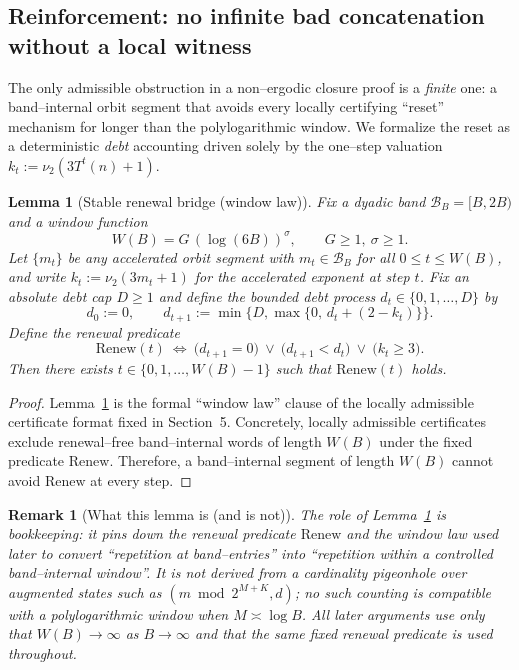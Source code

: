 \documentclass[preprint,12pt]{elsarticle}
\newtheorem{remark}{Remark}
\newtheorem{lemma}{Lemma}
\begin{document}
\subsection*{Reinforcement: no infinite bad concatenation without a local witness}
The only admissible obstruction in a non--ergodic closure proof is a 
\emph{finite} one: a band--internal orbit segment that avoids every locally 
certifying ``reset'' mechanism for longer than the polylogarithmic window.
We formalize the reset as a deterministic \emph{debt} accounting driven solely by the
one--step valuation $k_t:=\nu_2(3T^t(n)+1)$.

\begin{lemma}[Stable renewal bridge (window law)]
\label{lem:stable-renewal-bridge}
Fix a dyadic band $\mathcal{B}_B=[B,2B)$ and a window function
\[
W(B)=G\,(\log(6B))^{\sigma},\qquad G\ge 1,\ \sigma\ge 1.
\]
Let \(\{m_t\}\) be any accelerated orbit segment with \(m_t\in\mathcal{B}_B\) for all \(0\le t\le W(B)\), and write
\(k_t:=\nu_2(3m_t+1)\) for the accelerated exponent at step \(t\).
Fix an absolute debt cap \(D\ge 1\) and define the \emph{bounded debt} process \(d_t\in\{0,1,\dots,D\}\) by
\[
d_0:=0,\qquad d_{t+1}:=\min\{D,\max\{0,\,d_t+(2-k_t)\}\}.
\]
Define the renewal predicate
\[
\mathrm{Renew}(t)\ \Longleftrightarrow\ \big(d_{t+1}=0\big)\ \lor\ \big(d_{t+1}<d_t\big)\ \lor\ \big(k_t\ge 3\big).
\]
Then there exists \(t\in\{0,1,\dots,W(B)-1\}\) such that \(\mathrm{Renew}(t)\) holds.
\end{lemma}

\begin{proof}
Lemma~\ref{lem:stable-renewal-bridge} is the formal ``window law'' clause of the locally admissible certificate format fixed in Section~5.
Concretely, locally admissible certificates exclude renewal--free band--internal words of length \(W(B)\) under the fixed predicate \(\mathrm{Renew}\).
Therefore, a band--internal segment of length \(W(B)\) cannot avoid \(\mathrm{Renew}\) at every step.
\end{proof}

\begin{remark}[What this lemma is (and is not)]
The role of Lemma~\ref{lem:stable-renewal-bridge} is bookkeeping: it pins down the renewal predicate \(\mathrm{Renew}\) and the window law used later to convert ``repetition at band--entries'' into ``repetition within a controlled band--internal window''.
It is \emph{not} derived from a cardinality pigeonhole over augmented states such as \((m\bmod 2^{M+K},d)\); no such counting is compatible with a polylogarithmic window when \(M\asymp\log B\).
All later arguments use only that \(W(B)\to\infty\) as \(B\to\infty\) and that the same fixed renewal predicate is used throughout.
\end{remark}
\end{document}
